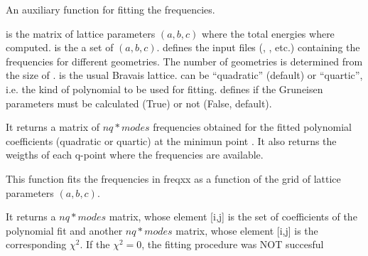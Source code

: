 \documentclass[letterpaper,10pt,english]{sphinxmanual}
\begin{document}
\begin{fulllineitems}
\label{pyqha:pyqha.fitfreqgrun.fitfreq}
An auxiliary function for fitting the frequencies.

 is the matrix of lattice parameters \((a,b,c)\) where the total
energies where computed.  is the a set of \((a,b,c)\). 
defines the input files (, , etc.) containing the 
frequencies for different geometries. The number of geometries is determined
from the size of .  is the usual Bravais lattice. 
 can be ``quadratic'' (default) or ``quartic'', i.e. the kind of 
polynomial to be used for fitting.  defines if the Gruneisen
parameters must be calculated (True) or not (False, default).

It returns a matrix of \(nq*modes\) frequencies obtained for the fitted 
polynomial coefficients (quadratic or quartic) at the 
minimun point . It also returns the weigths of each q-point where the 
frequencies are available.

\end{fulllineitems}


\begin{fulllineitems}
\label{pyqha:pyqha.fitfreqgrun.fitfreqxx}
This function fits the frequencies in freqxx as a function of the
grid of lattice parameters \((a,b,c)\).

It returns a \(nq*modes\) matrix, whose element {[}i,j{]} is the set of coefficients of the 
polynomial fit and another \(nq*modes\) matrix, whose element {[}i,j{]} is the corresponding
\(\chi^2\). If the \(\chi^2=0\), the fitting procedure was NOT succesful

\end{fulllineitems}

\end{document}
